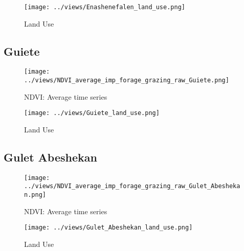 \documentclass[10pt,a4paper,onecolumn]{article}
\begin{document}
\begin{figure}[H] \centering
  \captionsetup{justification=centering}
\caption{Land Use} 
\centering


\texttt{[image: ../views/Enashenefalen\_land\_use.png]}

\end{figure}



\pagebreak


\subsection{Guiete}
\begin{figure}[H] \centering
  \captionsetup{justification=centering}
\caption{NDVI: Average time series } 
\centering


\texttt{[image: ../views/NDVI\_average\_imp\_forage\_grazing\_raw\_Guiete.png]}

\end{figure}


\begin{figure}[H] \centering
  \captionsetup{justification=centering}
\caption{Land Use} 
\centering


\texttt{[image: ../views/Guiete\_land\_use.png]}

\end{figure}


\pagebreak


\subsection{Gulet Abeshekan}
\begin{figure}[H] \centering
  \captionsetup{justification=centering}
\caption{NDVI: Average time series } 
\centering


\texttt{[image: ../views/NDVI\_average\_imp\_forage\_grazing\_raw\_Gulet\_Abeshekan.png]}

\end{figure}


\begin{figure}[H] \centering
  \captionsetup{justification=centering}
\caption{Land Use} 
\centering


\texttt{[image: ../views/Gulet\_Abeshekan\_land\_use.png]}

\end{figure}
\end{document}
